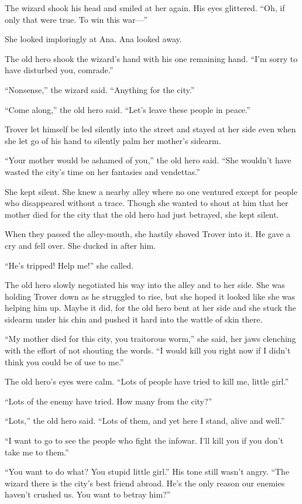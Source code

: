 The wizard shook his head and smiled at her again. His eyes
glittered. “Oh, if only that were true. To win this war---”

She looked imploringly at Ana. Ana looked away.

The old hero shook the wizard’s hand with his one remaining hand.
“I’m sorry to have disturbed you, comrade.”

“Nonsense,” the wizard said. “Anything for the city.”

“Come along,” the old hero said. “Let’s leave these people in
peace.”

Trover let himself be led silently into the street and stayed at
her side even when she let go of his hand to silently palm her
mother’s sidearm.

“Your mother would be ashamed of you,” the old hero said. “She
wouldn’t have wasted the city’s time on her fantasies and
vendettas.”

She kept silent. She knew a nearby alley where no one ventured
except for people who disappeared without a trace. Though she
wanted to shout at him that her mother died for the city that the
old hero had just betrayed, she kept silent.

When they passed the alley-mouth, she hastily shoved Trover into
it. He gave a cry and fell over. She ducked in after him.

“He’s tripped! Help me!” she called.

The old hero slowly negotiated his way into the alley and to her
side. She was holding Trover down as he struggled to rise, but she
hoped it looked like she was helping him up. Maybe it did, for the
old hero bent at her side and she stuck the sidearm under his chin
and pushed it hard into the wattle of skin there.

“My mother died for this city, you traitorous worm,” she said, her
jaws clenching with the effort of not shouting the words. “I would
kill you right now if I didn’t think you could be of use to me.”

The old hero’s eyes were calm. “Lots of people have tried to kill
me, little girl.”

“Lots of the enemy have tried. How many from the city?”

“Lots,” the old hero said. “Lots of them, and yet here I stand,
alive and well.”

“I want to go to see the people who fight the infowar. I’ll kill
you if you don’t take me to them.”

“You want to do what? You stupid little girl.” His tone still
wasn’t angry. “The wizard there is the city’s best friend abroad.
He’s the only reason our enemies haven’t crushed us. You want to
betray him?”


